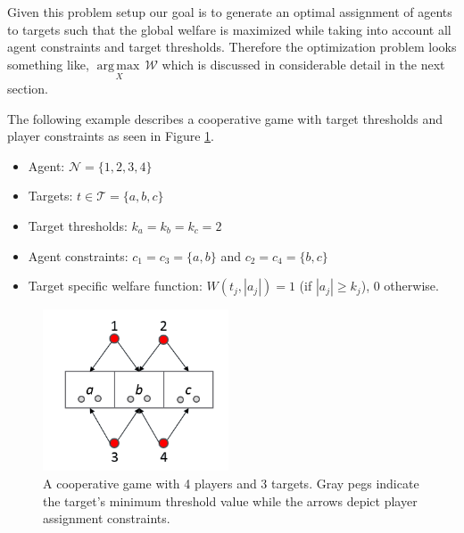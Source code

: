 \documentclass[11pt, onecolumn, compsoc, letterpaper]{article}
\DeclareMathOperator*{\argmaxop}{arg\,max\,}
\newcommand{\argmax}[1]{\underset{#1}{\argmaxop}}
\newcommand{\Pl}{\mathcal{N}} %
\newcommand{\Ta}{\mathcal{T}} %
\newcommand{\We}{\mathcal{W}} %
\begin{document}
Given this problem setup our goal is to generate an optimal assignment of agents to targets such that the global welfare is maximized while taking into account all agent constraints and target thresholds. Therefore the optimization problem looks something like, $\argmax{X} \We$ which is discussed in considerable detail in the next section.

The following example describes a cooperative game with target thresholds and player constraints as seen in Figure \ref{fig:ex1}.
\begin{itemize}
	\item Agent: $\Pl = \{1,2,3,4\}$
	\item Targets: $t \in \Ta = \{a, b, c\}$
	\item Target thresholds: $k_a = k_b = k_c = 2$
	\item Agent constraints: $c_1 = c_3 = \{a, b\}$ and $c_2 = c_4 = \{b, c\}$
	\item Target specific welfare function: $W(t_j, |a_j|) = 1$ (if $|a_j| \geq k_j$), $0$ otherwise.
	
\end{itemize}
\begin{figure}[!htb]
	\centering\includegraphics[width=5.5cm]{assets/ex1.png}
	\centering\caption{A cooperative game with 4 players and 3 targets. Gray pegs indicate the target's minimum threshold value while the arrows depict player assignment constraints.}\label{fig:ex1}
\end{figure}
\end{document}
